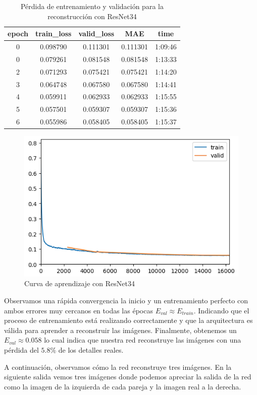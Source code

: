 \begin{table}[H]
	\centering
	\begin{tabular}{|ccccc|}
		\toprule
		epoch & train\_loss & valid\_loss & MAE & time \\ 
		\midrule
		0 & 0.098790 & 0.111301 & 0.111301 & 1:09:46 \\ 
		0 & 0.079261 & 0.081548 & 0.081548 & 1:13:33 \\
		2 & 0.071293 & 0.075421 & 0.075421 & 1:14:20 \\ 
		3 & 0.064748 & 0.067580 & 0.067580 & 1:14:41 \\ 
		4 & 0.059911 & 0.062933 & 0.062933 & 1:15:55 \\ 
		5 & 0.057501 & 0.059307 & 0.059307 & 1:15:36 \\ 
		6 & 0.055986 & 0.058405 & 0.058405 & 1:15:37 \\ 
		\bottomrule
	\end{tabular}
	\caption{Pérdida de entrenamiento y validación para la reconstrucción con ResNet34}
	\label{tabla:resultados2}
\end{table}

\begin{figure}[H]
	\centering
	\includegraphics[width=0.7\linewidth]{imagenes/curva_resnet34.png}
	\caption{Curva de aprendizaje con ResNet34}
\end{figure}

Observamos una rápida convergencia la inicio y un entrenamiento perfecto con ambos errores muy cercanos en todas las épocas $E_{val} \approx E_{train}$. Indicando que el proceso de entrenamiento está realizando correctamente y que la arquitectura es válida para aprender a reconstruir las imágenes. Finalmente, obtenemos un $E_{val} \approx 0.058$ lo cual indica que nuestra red reconstruye las imágenes con una pérdida del $5.8 \%$ de los detalles reales.

A continuación, observamos cómo la red reconstruye tres imágenes. En la siguiente salida vemos tres imágenes donde podemos apreciar la salida de la red como la imagen de la izquierda de cada pareja y la imagen real a la derecha.

